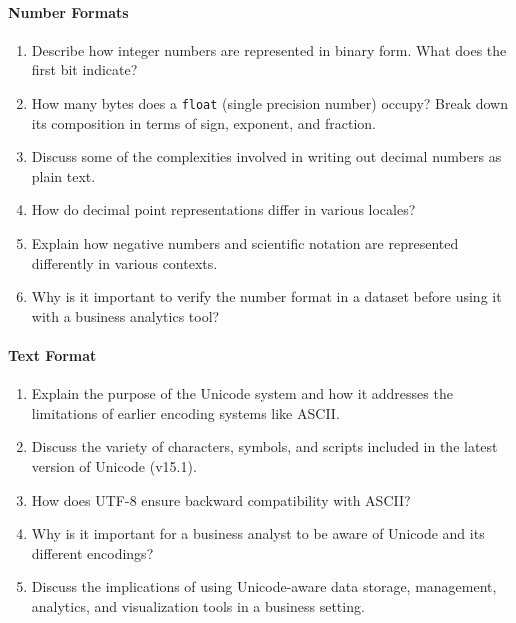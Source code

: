 \paragraph*{Number Formats}
\begin{enumerate}
	\item Describe how integer numbers are represented in binary form. What does the first bit indicate?
	\item How many bytes does a \texttt{float} (single precision number) occupy? Break down its composition in terms of sign, exponent, and fraction.
	\item Discuss some of the complexities involved in writing out decimal numbers as plain text.
	\item How do decimal point representations differ in various locales?
	\item Explain how negative numbers and scientific notation are represented differently in various contexts.
	\item Why is it important to verify the number format in a dataset before using it with a business analytics tool?
\end{enumerate}
\paragraph*{Text Format}
\begin{enumerate}
    \item Explain the purpose of the Unicode system and how it addresses the limitations of earlier encoding systems like ASCII.
    \item Discuss the variety of characters, symbols, and scripts included in the latest version of Unicode (v15.1).
    \item How does UTF-8 ensure backward compatibility with ASCII?
    \item Why is it important for a business analyst to be aware of Unicode and its different encodings?
    \item Discuss the implications of using Unicode-aware data storage, management, analytics, and visualization tools in a business setting.
\end{enumerate}
